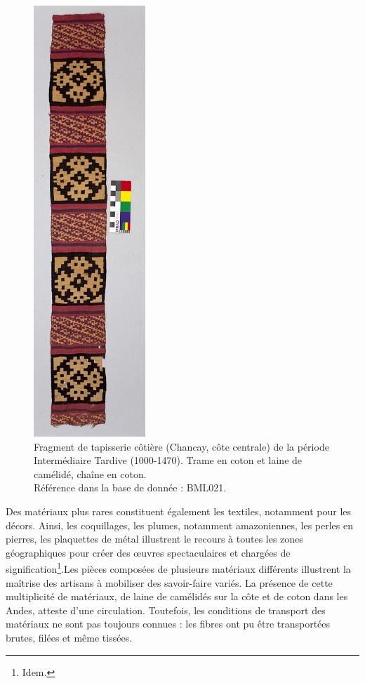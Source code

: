 \begin{figure}[!ht]
        \begin{center}
        		\includegraphics[width=4.2cm, angle=-90]{../images/BML021_IMG_3319.jpg}
	\end{center}
    \caption{Fragment de tapisserie côtière (Chancay, côte centrale) de la période Intermédiaire Tardive (1000-1470). Trame en coton et laine de camélidé, chaîne en coton. \\ Référence dans la base de donnée :  BML021.}     
    \label{fig:BML021}
\end{figure}

\noindent Des matériaux plus rares constituent également les textiles, notamment pour les décors. Ainsi, les coquillages, les plumes, notamment amazoniennes, les perles en pierres, les plaquettes de métal illustrent \og le recours à toutes les zones géographiques pour créer des \oe{}uvres spectaculaires et chargées de signification\footnote{Idem.}.\fg \:Les pièces composées de plusieurs matériaux différents illustrent la maîtrise des artisans à mobiliser des savoir-faire variés. La présence de cette multiplicité de matériaux, de laine de camélidés sur la côte et de coton dans les Andes, atteste d'une circulation. Toutefois, les conditions de transport des matériaux ne sont pas toujours connues : les fibres ont pu être transportées brutes, filées et même tissées.\\

